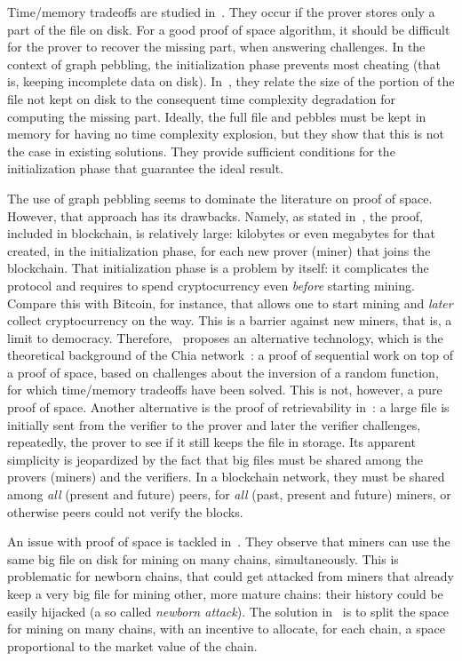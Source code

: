 Time/memory tradeoffs are studied in~\cite{Reyzin23}. They occur if
the prover stores only a part of the file on disk.
For a good proof of space algorithm, it should be difficult for the prover to recover the
missing part, when answering challenges.
In the context of graph pebbling, the initialization phase prevents most cheating
(that is, keeping incomplete data on disk). In~\cite{Reyzin23}, they relate the size
of the portion of the file not kept on disk to the consequent time
complexity degradation for computing the missing part.
Ideally, the full file and pebbles must be kept in memory
for having no time complexity explosion, but they show that this is not the case in existing solutions.
They provide sufficient conditions for the initialization phase that guarantee the ideal result.

The use of graph pebbling seems to dominate the literature on proof of space.
However, that approach has its drawbacks.
Namely, as stated in~\cite{AbusalahACKPR17}, the proof, included in blockchain, is relatively large:
kilobytes or even megabytes for that created, in the initialization phase, for each new
prover (miner) that joins the blockchain. That initialization phase is a problem by itself: it complicates
the protocol and requires to spend cryptocurrency even \emph{before}
starting mining. Compare this with Bitcoin, for instance, that allows one to start mining
and \emph{later} collect cryptocurrency on the way. This is a barrier against new
miners, that is, a limit to democracy.
Therefore, \cite{AbusalahACKPR17}~proposes an alternative technology, which is the
theoretical background of the Chia network~\cite{CohenP19,Chia}:
a proof of sequential work on top of a proof of space, based on challenges
about the inversion of a random function, for which time/memory tradeoffs have been solved.
This is not, however, a pure proof of space.
Another alternative is the proof of retrievability in~\cite{JuelsK07}: a large file
is initially sent from the verifier to the prover and later the verifier
challenges, repeatedly, the prover to see if it still keeps the file in storage.
Its apparent simplicity
is jeopardized by the fact that big files must be shared among the provers (miners) and
the verifiers. In a blockchain network, they must be shared among \emph{all} (present and future)
peers, for \emph{all} (past, present and future) miners, or otherwise peers could not verify the blocks.

An issue with proof of space is tackled in~\cite{TangZDWLG0L19}.
They observe that miners can use the same big file on disk
for mining on many chains, simultaneously. This is problematic for newborn chains, that could
get attacked from miners that already keep a very big file for mining other,
more mature chains: their history could be easily hijacked
(a so called \emph{newborn attack}). The solution in~\cite{TangZDWLG0L19} is
to split the space for mining on many chains, with an
incentive to allocate, for each chain, a space proportional
to the market value of the chain.

